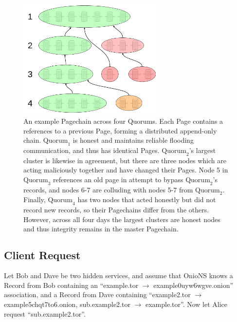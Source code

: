 \begin{figure}[htbp]
	\centering
	\includegraphics[width=0.65\textwidth]{images/LucidCharts/Page-chain.pdf}
	\caption{An example Pagechain across four Quorums. Each Page contains a references to a previous Page, forming a distributed append-only chain. $ \mathrm{Quorum}_{1} $ is honest and maintains reliable flooding communication, and thus has identical Pages. $ \mathrm{Quorum}_{2} $'s largest cluster is likewise in agreement, but there are three nodes which are acting maliciously together and have changed their Pages. Node 5 in $ \mathrm{Quorum}_{3} $ references an old page in attempt to bypass $ \mathrm{Quorum}_{2} $'s records, and nodes 6-7 are colluding with nodes 5-7 from $ \mathrm{Quorum}_{2} $. Finally, $ \mathrm{Quorum}_{4} $ has two nodes that acted honestly but did not record new records, so their Pagechains differ from the others. However, across all four days the largest clusters are honest nodes and thus integrity remains in the master Pagechain.}
	\label{fig:sidechains}
\end{figure}

\subsection{Client Request}
\label{sec:ClientRequest}


Let Bob and Dave be two hidden services, and assume that OnioNS knows a Record from Bob containing an ``example.tor $ \rightarrow $ example0uyw6wgve.onion'' association, and a Record from Dave containing ``example2.tor $ \rightarrow $ example5chqt7to6.onion, sub.example2.tor $ \rightarrow $ example.tor''. Now let Alice request ``sub.example2.tor''.

